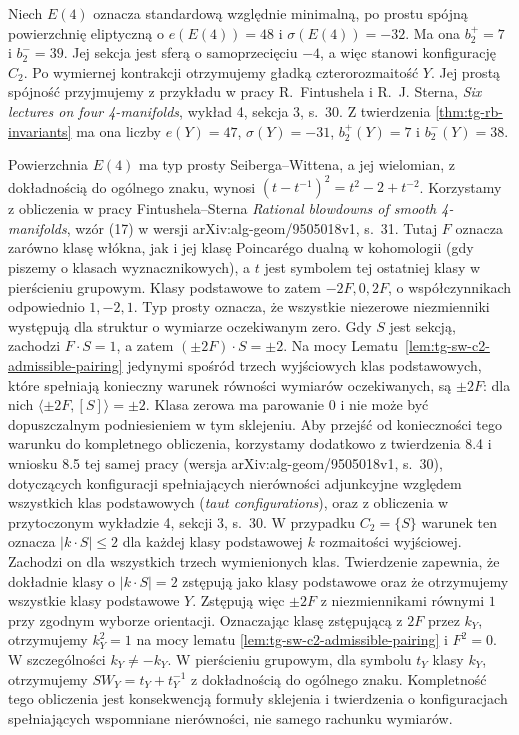 \begin{przyklad}
Niech $E(4)$ oznacza standardową względnie minimalną,
po prostu spójną powierzchnię eliptyczną o
$e(E(4))=48$ i $\sigma(E(4))=-32$.
Ma ona $b_2^+=7$ i $b_2^-=39$.
Jej sekcja jest sferą o samoprzecięciu $-4$,
a więc stanowi konfigurację $C_2$. Po wymiernej
kontrakcji otrzymujemy gładką czterorozmaitość $Y$.
Jej prostą spójność przyjmujemy z przykładu
w pracy R.~Fintushela i R.~J. Sterna,
\emph{Six lectures on four 4-manifolds},
wykład 4, sekcja 3, s.~30.
Z twierdzenia \ref{thm:tg-rb-invariants} ma ona liczby $e(Y)=47$, $\sigma(Y)=-31$,
$b_2^+(Y)=7$ i $b_2^-(Y)=38$.

Powierzchnia $E(4)$ ma typ prosty Seiberga--Wittena,
a jej wielomian, z dokładnością do ogólnego znaku,
wynosi $(t-t^{-1})^2=t^2-2+t^{-2}$.
Korzystamy z obliczenia w pracy Fintushela--Sterna
\emph{Rational blowdowns of smooth 4-manifolds},
wzór (17) w wersji arXiv:alg-geom/9505018v1,
s.~31.
Tutaj $F$ oznacza zarówno klasę włókna, jak i
jej klasę Poincarégo dualną w kohomologii
(gdy piszemy o klasach wyznacznikowych),
a $t$ jest symbolem tej ostatniej klasy
w pierścieniu grupowym.
Klasy podstawowe to zatem $-2F,0,2F$,
o współczynnikach odpowiednio $1,-2,1$.
Typ prosty oznacza, że wszystkie niezerowe
niezmienniki występują dla struktur o wymiarze
oczekiwanym zero.
Gdy $S$ jest sekcją, zachodzi $F\cdot S=1$,
a zatem $(\pm2F)\cdot S=\pm2$.
Na mocy Lematu~\ref{lem:tg-sw-c2-admissible-pairing}
jedynymi spośród trzech wyjściowych klas podstawowych,
które spełniają konieczny warunek równości wymiarów
oczekiwanych, są $\pm2F$:
dla nich $\langle\pm2F,[S]\rangle=\pm2$.
Klasa zerowa ma parowanie $0$ i nie może być
dopuszczalnym podniesieniem w tym sklejeniu.
Aby przejść od konieczności tego warunku
do kompletnego obliczenia, korzystamy dodatkowo
z twierdzenia 8.4 i wniosku 8.5 tej samej pracy
(wersja arXiv:alg-geom/9505018v1, s.~30),
dotyczących konfiguracji spełniających nierówności
adjunkcyjne względem wszystkich klas podstawowych
(\emph{taut configurations}), oraz z obliczenia
w przytoczonym wykładzie 4, sekcji 3, s.~30.
W przypadku $C_2=\{S\}$ warunek ten oznacza
$|k\cdot S|\leq2$ dla każdej klasy podstawowej
$k$ rozmaitości wyjściowej. Zachodzi on
dla wszystkich trzech wymienionych klas.
Twierdzenie zapewnia, że dokładnie klasy
o $|k\cdot S|=2$ zstępują jako klasy podstawowe
oraz że otrzymujemy wszystkie klasy podstawowe $Y$.
Zstępują więc $\pm2F$ z niezmiennikami równymi
$1$ przy zgodnym wyborze orientacji.
Oznaczając klasę zstępującą z $2F$ przez $k_Y$,
otrzymujemy $k_Y^2=1$ na mocy lematu
\ref{lem:tg-sw-c2-admissible-pairing}
i $F^2=0$. W szczególności $k_Y\ne-k_Y$.
W pierścieniu grupowym, dla symbolu $t_Y$ klasy
$k_Y$, otrzymujemy
$SW_Y=t_Y+t_Y^{-1}$ z dokładnością do ogólnego znaku.
Kompletność tego obliczenia jest konsekwencją
formuły sklejenia i twierdzenia o konfiguracjach
spełniających wspomniane nierówności,
nie samego rachunku wymiarów.
\end{przyklad}


